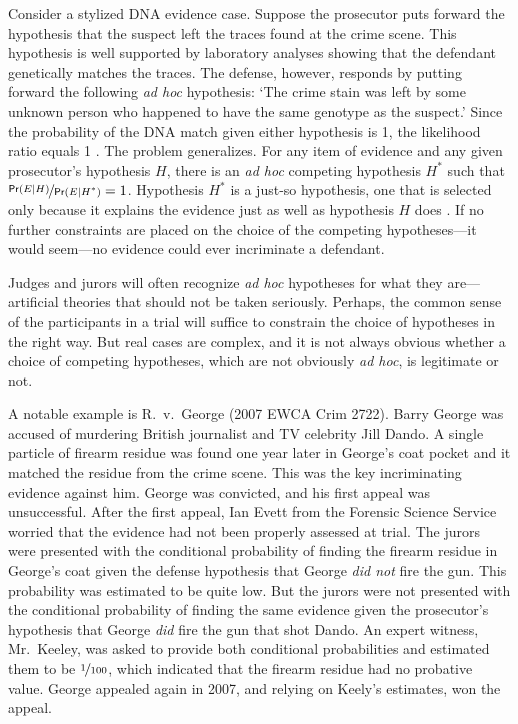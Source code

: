 \documentclass{article}
\newcommand{\pr}{\mathsf{Pr}}
\begin{document}
Consider a stylized DNA evidence case. Suppose the prosecutor puts forward the hypothesis that the suspect left the traces found at the crime scene. This hypothesis is well supported by laboratory analyses showing that the defendant genetically matches the traces. 
The defense, however, responds by putting forward the following \textit{ad hoc} hypothesis:  `The crime stain was left by some unknown person who happened to have the same genotype as the suspect.' Since the probability of the DNA match given either hypothesis is 1, the likelihood ratio equals 1 \citep{evett2000MoreHierarchyPropositions}. The problem generalizes. For any item of evidence and any given prosecutor's hypothesis $H$, there is an \textit{ad hoc} competing hypothesis $H^*$ such that $\nicefrac{\pr(E \vert H)}{\pr(E \vert H^*)}=1$.
Hypothesis $H^*$ is a just-so hypothesis, one that is selected only because it explains the evidence just as well as hypothesis $H$ does \citep{mayo2018}. 
If no further constraints are placed on the choice of the competing hypotheses---it would seem---no evidence could ever  incriminate a defendant. %

Judges and jurors will often recognize \textit{ad hoc} hypotheses for what they are---artificial theories that should not be taken seriously. Perhaps, the common sense of the participants in a trial will suffice to constrain the choice of hypotheses in the right way. But real cases are complex, and it is not always obvious whether a choice of competing hypotheses, which are not obviously \textit{ad hoc}, is legitimate or not. 


 
 A notable example is R.\ v.\  
George (2007 EWCA Crim 2722). Barry George was accused of murdering British journalist and TV celebrity Jill Dando. 
	A single particle of firearm  residue %
	 was found one year later in George's coat pocket and it matched the residue from the crime scene.
	 This was the key incriminating evidence against him. 
George was convicted, and his first appeal was unsuccessful. 
After the first appeal, Ian Evett from the Forensic Science Service worried that the evidence had not been properly assessed at trial. The jurors  were presented with the conditional probability 
of finding the  firearm residue in George's coat given the defense hypothesis %
that George \textit{did not} fire the gun. This probability was estimated to be quite low. 
But the jurors were not presented with the conditional probability 
of finding the same evidence given the prosecutor's hypothesis 
that George \textit{did} fire the gun that shot Dando.
\noindent 
An expert witness, Mr.\ Keeley, was asked to provide both conditional probabilities and estimated them to be $\nicefrac{1}{100}$, which indicated that the firearm residue had no probative value. 
George appealed again in 2007, and relying on Keely's estimates, won the appeal.
\end{document}
